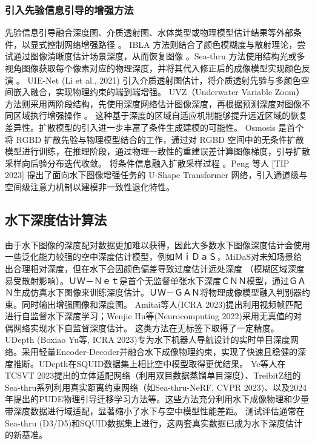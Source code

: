 \documentclass[twocolumn]{article}
\begin{document}
\subsubsection{引入先验信息引导的增强方法}
先验信息引导融合深度图、介质透射图、水体类型或物理模型估计结果等外部条件，以显式控制网络增强路径 \cite{ref16, ref19, ref21}。
IBLA 方法则结合了颜色模糊度与散射理论，尝试通过图像清晰度估计场景深度，从而恢复图像 \cite{ref7}。Sea-thru 方法使用结构光或多视角图像获取每个像素对应的物理深度，并将其代入修正后的成像模型实现颜色反演 \cite{ref18}。
UIE-Net (Li et al., 2021) 引入介质透射图估计，将介质透射先验与多颜色空间嵌入融合，实现物理约束的端到端增强。
UVZ（Underwater Variable Zoom）方法则采用两阶段结构，先使用深度网络估计图像深度，再根据预测深度对图像不同区域执行增强操作 \cite{ref19}。
这种基于深度的区域自适应机制能够提升远近区域的恢复差异性。扩散模型的引入进一步丰富了条件生成建模的可能性。
Osmosis 是首个将 RGBD 扩散先验与物理模型结合的工作，通过对 RGBD 空间中的无条件扩散模型进行训练，在推理阶段，通过物理一致性的重建误差计算图像梯度，引导扩散采样向后验分布迭代收敛。
将条件信息融入扩散采样过程 \cite{ref23, ref24}。Peng 等人 [TIP 2023] 提出了面向水下图像增强任务的 U-Shape Transformer 网络，引入通道级与空间级注意力机制以建模非一致性退化特性。


\subsection{水下深度估计算法}
由于水下图像的深度配对数据更加难以获得，因此大多数水下图像深度估计会使用一些泛化能力较强的空中深度估计模型，例如ＭｉＤａＳ，MiDaS对未知场景给出合理相对深度，但在水下会因颜色偏差导致过度估计远处深度
（模糊区域深度易受散射影响）。ＵＷ－Ｎｅｔ是首个无监督单张水下深度ＣＮＮ模型，通过ＧＡＮ生成仿真水下图像来训练深度估计。ＵＷ－ＧＡＮ将物理成像模型融入判别器约束。同时输出增强图像和深度图。
Amitai等人(ICRA 2023)提出利用视频帧匹配进行自监督水下深度学习；Wenjie Hu等(Neurocomputing 2022)采用无真值的对偶网络实现水下自监督深度估计。
这类方法在无标签下取得了一定精度。
UDepth (Boxiao Yu等, ICRA 2023)专为水下机器人导航设计的实时单目深度网络。采用轻量Encoder-Decoder并融合水下成像物理约束，实现了快速且稳健的深度推断。UDepth在SQUID数据集上相比空中模型取得更优结果。
Ye等人在TCSVT 2023提出的立体适配网络（利用双目数据蒸馏单目深度）、TreibitZ组的Sea-thru系列利用真实距离约束网络（如Sea-thru-NeRF, CVPR 2023)、以及2024年提出的PUDE物理引导迁移学习方法等。这些方法充分利用水下成像物理和少量带深度数据进行域适配，显著缩小了水下与空中模型性能差距。
测试评估通常在Sea-thru (D3/D5)和SQUID数据集上进行，这两套真实数据已成为水下深度估计的新基准。
\end{document}
